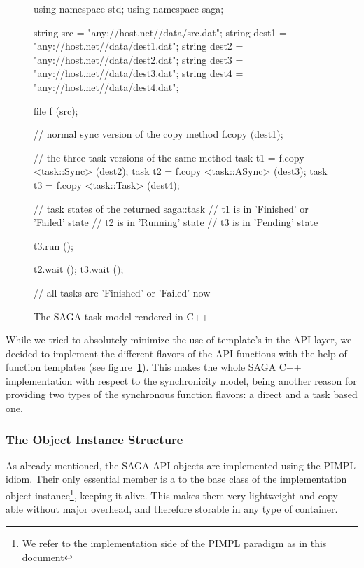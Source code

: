 \begin{figure}[!ht]
 \begin{center}
  \begin{mycode}[label=SAGA task model]
  {
    using namespace std;
    using namespace saga;

    string src   = "any://host.net//data/src.dat";
    string dest1 = "any://host.net//data/dest1.dat";
    string dest2 = "any://host.net//data/dest2.dat";
    string dest3 = "any://host.net//data/dest3.dat";
    string dest4 = "any://host.net//data/dest4.dat";

    file f (src);

    // normal sync version of the copy method
    f.copy (dest1);

    // the three task versions of the same method
    task t1 = f.copy <task::Sync>  (dest2);
    task t2 = f.copy <task::ASync> (dest3);
    task t3 = f.copy <task::Task>  (dest4);

    // task states of the returned saga::task
    // t1 is in 'Finished' or 'Failed' state
    // t2 is in 'Running'              state
    // t3 is in 'Pending'              state

    t3.run  ();

    t2.wait ();
    t3.wait ();

    // all tasks are 'Finished' or 'Failed' now
  }
  \end{mycode}
  \up
  \up
  \caption{\label{src:tasks}
    The SAGA task model rendered in C++}
 \end{center}
\end{figure}

While we tried to absolutely minimize the use of template's in the 
API layer, we decided to implement the different flavors of the API 
functions with the help of function templates (see figure~\ref{src:tasks}). 
This makes the whole SAGA C++ implementation  with respect to 
the synchronicity model, being another reason for providing 
two types of the synchronous function flavors: a direct and a task 
based one.

\subsubsection{The Object Instance Structure}
\label{ssec:pimpl}

As already mentioned, the SAGA API objects are implemented using the PIMPL idiom.
Their only essential member is a  to the 
base class of the implementation object instance\footnote{\small We refer to the 
implementation side of the PIMPL paradigm as  in this document}, 
keeping it alive. This makes them very 
lightweight and copy able without major overhead, and therefore storable in any 
type of container.

